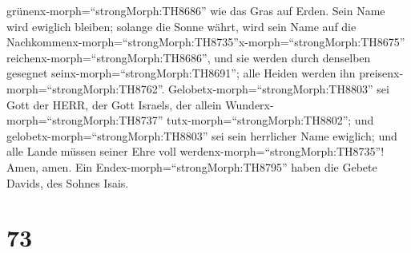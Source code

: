 grünenx-morph=``strongMorph:TH8686'' wie das Gras auf Erden.
 Sein Name wird ewiglich bleiben; solange die Sonne währt,
wird sein Name auf die
Nachkommenx-morph=``strongMorph:TH8735''\textbar x-morph=``strongMorph:TH8675''
reichenx-morph=``strongMorph:TH8686'', und sie werden durch denselben
gesegnet seinx-morph=``strongMorph:TH8691''; alle Heiden werden ihn
preisenx-morph=``strongMorph:TH8762''. 
Gelobetx-morph=``strongMorph:TH8803'' sei Gott der HERR, der Gott
Israels, der allein Wunderx-morph=``strongMorph:TH8737''
tutx-morph=``strongMorph:TH8802'';  und
gelobetx-morph=``strongMorph:TH8803'' sei sein herrlicher Name ewiglich;
und alle Lande müssen seiner Ehre voll
werdenx-morph=``strongMorph:TH8735''! Amen, amen.  Ein
Endex-morph=``strongMorph:TH8795'' haben die Gebete Davids, des Sohnes
Isais.

\hypertarget{section-72}{%
\section{73}\label{section-72}}

